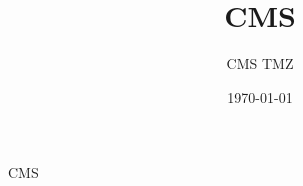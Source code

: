 \documentclass[UTF8]{ctexart}
\title{CMS}
\author{CMS TMZ}
\date{\today}
\begin{document}
\maketitle
CMS
\end{document}
